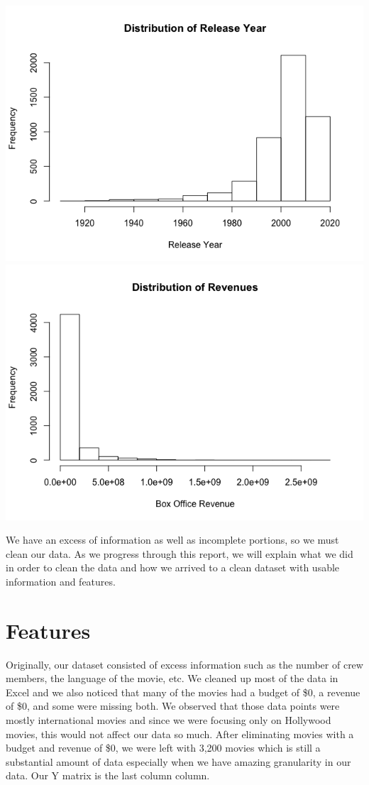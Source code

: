 \documentclass{article}
\begin{document}
    \includegraphics[scale=.25]{release.png}
    \includegraphics[scale=.25]{revenue.png}
    
    We have an excess of information as well as incomplete portions, so we must clean our data. As we progress through this report, we will explain what we did in order to clean the data and how we arrived to a clean dataset with usable information and features.

\section{Features}

    Originally, our dataset consisted of excess information such as the number of crew members, the language of the movie, etc. We cleaned up most of the data in Excel and we also noticed that many of the movies had a budget of \$0, a revenue of \$0, and some were missing both. We observed that those data points were mostly international movies and since we were focusing only on Hollywood movies, this would not affect our data so much. After eliminating movies with a budget and revenue of \$0, we were left with 3,200 movies which is still a substantial amount of data especially when we have amazing granularity in our data. Our Y matrix is the last column column.
    
\end{document}
